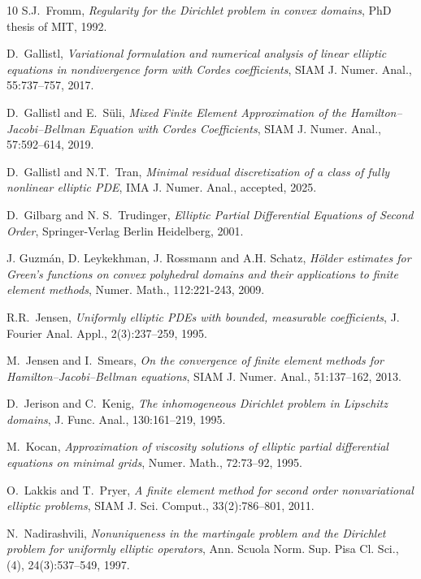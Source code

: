 \documentclass[12pt]{amsart}
\theoremstyle{definition}
\theoremstyle{remark}
\begin{document}
\begin{thebibliography}{10}
{\sc S.J.~Fromm}, {\em Regularity for the Dirichlet problem in convex domains}, 
PhD thesis of MIT, 1992.

{\sc D.~Gallistl}, {\em Variational formulation and numerical analysis of linear 
elliptic equations in nondivergence form with Cordes coefficients}, 
SIAM J. Numer. Anal., 55:737--757, 2017.

{\sc D.~Gallistl and E.~S{\"{u}}li}, {\em Mixed Finite Element Approximation of the Hamilton--Jacobi--Bellman 
Equation with Cordes Coefficients}, SIAM J. Numer. Anal., 57:592--614, 2019.

{\sc D.~Gallistl and N.T.~Tran}, {\em Minimal residual discretization of a class 
of fully nonlinear elliptic PDE}, IMA J. Numer. Anal., accepted, 2025. 

{\sc D.~Gilbarg and N. S.~Trudinger}, {\em Elliptic Partial Differential Equations of Second Order}, Springer-Verlag Berlin Heidelberg, 2001.
  
{\sc J. Guzm\'{a}n, D. Leykekhman, J. Rossmann and A.H. Schatz}, {\em H\"{o}lder estimates for Green's functions on convex polyhedral domains and their applications to finite element methods}, Numer. Math., 112:221-243, 2009.

{\sc R.R.~Jensen}, {\em Uniformly elliptic PDEs with bounded, measurable coefficients}, 
J. Fourier Anal. Appl., 2(3):237--259, 1995.

{\sc M.~Jensen and I.~Smears}, {\em On the convergence of finite element methods 
for Hamilton--Jacobi--Bellman equations}, SIAM J. Numer. Anal., 51:137--162, 2013.
  
{\sc D.~Jerison and C.~Kenig}, {\em The inhomogeneous Dirichlet problem 
in Lipschitz domains}, J. Func. Anal., 130:161--219, 1995.  

{\sc M.~Kocan}, {\em Approximation of viscosity solutions of elliptic partial 
differential equations on minimal grids}, Numer. Math., 72:73--92, 1995.

{\sc O.~Lakkis and T.~Pryer}, {\em A finite element method for second order nonvariational elliptic problems}, 
SIAM J. Sci. Comput., 33(2):786--801, 2011.

{\sc N.~Nadirashvili}, {\em Nonuniqueness in the martingale problem and the 
Dirichlet problem for uniformly elliptic operators}, 
Ann. Scuola Norm. Sup. Pisa Cl. Sci., (4), 24(3):537--549, 1997.


\end{thebibliography}
\end{document}
